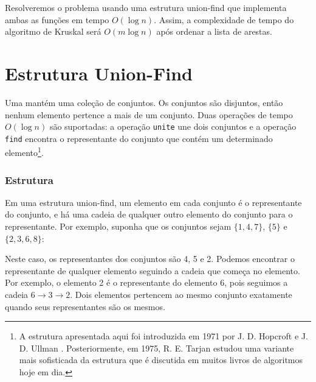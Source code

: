 Resolveremos o problema usando uma estrutura union-find 
que implementa ambas as funções em tempo $O(\log n)$. 
Assim, a complexidade de tempo do algoritmo de Kruskal 
será $O(m \log n)$ após ordenar a lista de arestas.

\section{Estrutura Union-Find}


Uma  mantém 
uma coleção de conjuntos. 
Os conjuntos são disjuntos, então nenhum elemento 
pertence a mais de um conjunto. 
Duas operações de tempo $O(\log n)$ são suportadas: 
a operação \texttt{unite} une dois conjuntos 
e a operação \texttt{find} encontra o representante do conjunto 
que contém um determinado elemento\footnote{A estrutura apresentada aqui 
foi introduzida em 1971 por J. D. Hopcroft e J. D. Ullman \cite{hop71}. 
Posteriormente, em 1975, R. E. Tarjan estudou uma variante mais sofisticada 
da estrutura \cite{tar75} que é discutida em muitos livros de algoritmos 
hoje em dia.}.

\subsubsection{Estrutura}

Em uma estrutura union-find, um elemento em cada conjunto 
é o representante do conjunto, 
e há uma cadeia de qualquer outro elemento do 
conjunto para o representante. 
Por exemplo, suponha que os conjuntos sejam 
$\{1,4,7\}$, $\{5\}$ e $\{2,3,6,8\}$:
\begin{center}
\end{center}
Neste caso, os representantes 
dos conjuntos são 4, 5 e 2. 
Podemos encontrar o representante de qualquer elemento 
seguindo a cadeia que começa no elemento. 
Por exemplo, o elemento 2 é o representante 
do elemento 6, pois 
seguimos a cadeia $6 \rightarrow 3 \rightarrow 2$. 
Dois elementos pertencem ao mesmo conjunto exatamente quando 
seus representantes são os mesmos.

